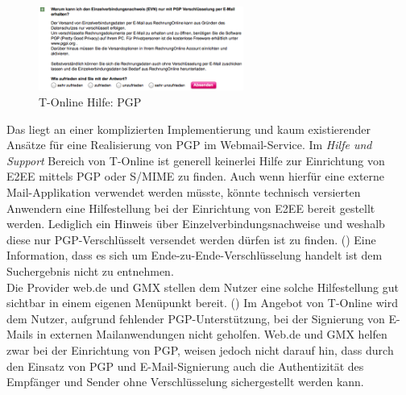 \documentclass  [paper=a4,
				fontsize=12pt,
				listof=totoc,
				bibliography=totoc
				]{scrreprt}
\begin{document}
			\begin{figure} %
				\vspace{-12pt}
				\centering
				\includegraphics[width=0.6\textwidth]{images/T-Online_Hilfe_PGP}
				\caption[T-Online PGP]{T-Online Hilfe: PGP} 
				\label{fig:T-Online_Hilfe_PGP} %
				\vspace{-12pt}
			\end{figure}
			Das liegt an einer komplizierten Implementierung und kaum existierender Ansätze für eine Realisierung von PGP im Webmail-Service.
			Im \textit{Hilfe und Support} Bereich von T-Online ist generell keinerlei Hilfe zur Einrichtung von \ac{E2EE} mittels \ac{PGP} oder \ac{S/MIME} zu finden.
			Auch wenn hierfür eine externe Mail-Applikation verwendet werden müsste, könnte technisch versierten Anwendern eine Hilfestellung bei der Einrichtung von \ac{E2EE} bereit gestellt werden.
			Lediglich ein Hinweis über Einzelverbindungsnachweise und weshalb diese nur \ac{PGP}-Verschlüsselt versendet werden dürfen ist zu finden. ()
			Eine Information, dass es sich um Ende-zu-Ende-Verschlüsselung handelt ist dem Suchergebnis nicht zu entnehmen.\\
			Die Provider web.de und GMX stellen dem Nutzer eine solche Hilfestellung gut sichtbar in einem eigenen Menüpunkt bereit. ()
			Im Angebot von T-Online wird dem Nutzer, aufgrund fehlender \ac{PGP}-Unterstützung, bei der Signierung von E-Mails in externen Mailanwendungen nicht geholfen. 
			Web.de und GMX helfen zwar bei der Einrichtung von \ac{PGP}, weisen jedoch nicht darauf hin, dass durch den Einsatz von \ac{PGP} und E-Mail-Signierung auch die Authentizität des Empfänger und Sender ohne Verschlüsselung sichergestellt werden kann. \\
			
\end{document}
